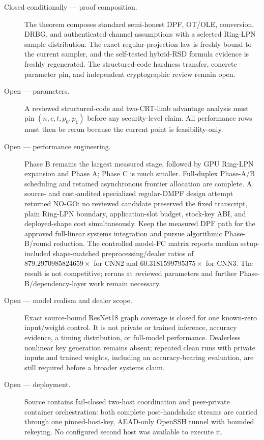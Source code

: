 \documentclass[11pt]{article}
\begin{document}
\begin{description}
\item[Closed conditionally --- proof composition.] The theorem composes
  standard semi-honest DPF, OT/OLE, conversion, DRBG, and authenticated-channel
assumptions with a selected Ring-LPN sample distribution. The exact
regular-projection law is freshly bound to the current sampler, and the
self-tested hybrid-RSD formula evidence is freshly regenerated. The
structured-code hardness transfer, concrete parameter pin, and independent
cryptographic review remain open.
\item[Open --- parameters.] A reviewed structured-code and two-CRT-limb
  advantage analysis must pin $(n,c,t,p_0,p_1)$ before any security-level
  claim. All performance rows must then be rerun because the current point is
  feasibility-only.
\item[Open --- performance engineering.] Phase B remains the largest measured
  stage, followed by GPU Ring-LPN expansion and Phase A; Phase C is much
  smaller. Full-duplex Phase-A/B scheduling and retained asynchronous frontier
  allocation are complete. A source- and cost-audited specialized regular-DMPF
  design attempt returned NO-GO: no reviewed candidate preserved the fixed
  transcript, plain Ring-LPN boundary, application-slot budget, stock-key ABI,
  and deployed-shape cost simultaneously. Keep the measured DPF path for the
  approved full-linear systems integration and pursue algorithmic Phase-B/round
  reduction. The controlled model-FC matrix reports median setup-included
  shape-matched preprocessing/dealer ratios of $879.2970985824659\times$ for
  CNN2 and $60.3181599795375\times$ for CNN3. The result is not competitive;
  reruns at reviewed parameters and further Phase-B/dependency-layer work
  remain necessary.
\item[Open --- model realism and dealer scope.] Exact source-bound ResNet18
  graph coverage is closed for one known-zero input/weight control. It is not
  private or trained inference, accuracy evidence, a timing distribution, or
  full-model performance. Dealerless nonlinear key generation remains absent;
  repeated clean runs with private inputs and trained weights, including an
  accuracy-bearing evaluation, are still required before a broader systems
  claim.
\item[Open --- deployment.] Source contains fail-closed two-host coordination
  and peer-private container orchestration: both complete post-handshake
  streams are carried through one pinned-host-key, AEAD-only OpenSSH tunnel
  with bounded rekeying. No configured second host was available to execute it.

\end{description}
\end{document}
